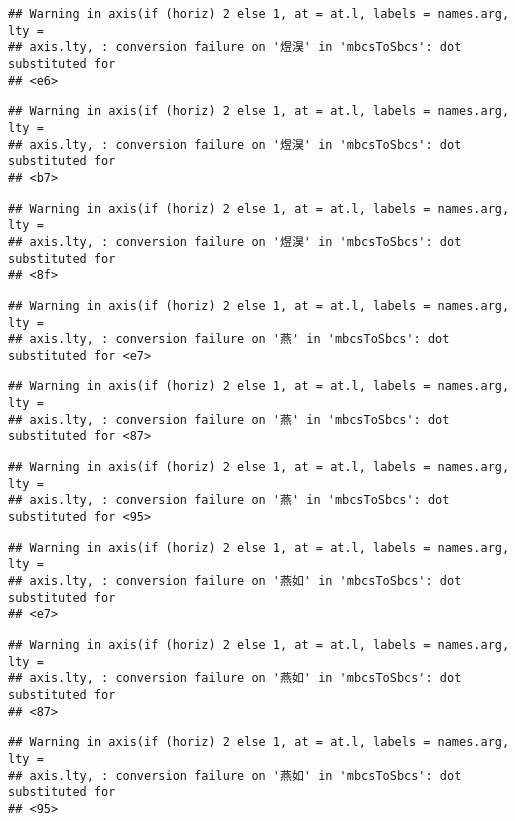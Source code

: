 \documentclass[
]{article}
\begin{document}
\begin{verbatim}
## Warning in axis(if (horiz) 2 else 1, at = at.l, labels = names.arg, lty =
## axis.lty, : conversion failure on '煜淏' in 'mbcsToSbcs': dot substituted for
## <e6>
\end{verbatim}

\begin{verbatim}
## Warning in axis(if (horiz) 2 else 1, at = at.l, labels = names.arg, lty =
## axis.lty, : conversion failure on '煜淏' in 'mbcsToSbcs': dot substituted for
## <b7>
\end{verbatim}

\begin{verbatim}
## Warning in axis(if (horiz) 2 else 1, at = at.l, labels = names.arg, lty =
## axis.lty, : conversion failure on '煜淏' in 'mbcsToSbcs': dot substituted for
## <8f>
\end{verbatim}

\begin{verbatim}
## Warning in axis(if (horiz) 2 else 1, at = at.l, labels = names.arg, lty =
## axis.lty, : conversion failure on '燕' in 'mbcsToSbcs': dot substituted for <e7>
\end{verbatim}

\begin{verbatim}
## Warning in axis(if (horiz) 2 else 1, at = at.l, labels = names.arg, lty =
## axis.lty, : conversion failure on '燕' in 'mbcsToSbcs': dot substituted for <87>
\end{verbatim}

\begin{verbatim}
## Warning in axis(if (horiz) 2 else 1, at = at.l, labels = names.arg, lty =
## axis.lty, : conversion failure on '燕' in 'mbcsToSbcs': dot substituted for <95>
\end{verbatim}

\begin{verbatim}
## Warning in axis(if (horiz) 2 else 1, at = at.l, labels = names.arg, lty =
## axis.lty, : conversion failure on '燕如' in 'mbcsToSbcs': dot substituted for
## <e7>
\end{verbatim}

\begin{verbatim}
## Warning in axis(if (horiz) 2 else 1, at = at.l, labels = names.arg, lty =
## axis.lty, : conversion failure on '燕如' in 'mbcsToSbcs': dot substituted for
## <87>
\end{verbatim}

\begin{verbatim}
## Warning in axis(if (horiz) 2 else 1, at = at.l, labels = names.arg, lty =
## axis.lty, : conversion failure on '燕如' in 'mbcsToSbcs': dot substituted for
## <95>
\end{verbatim}
\end{document}
